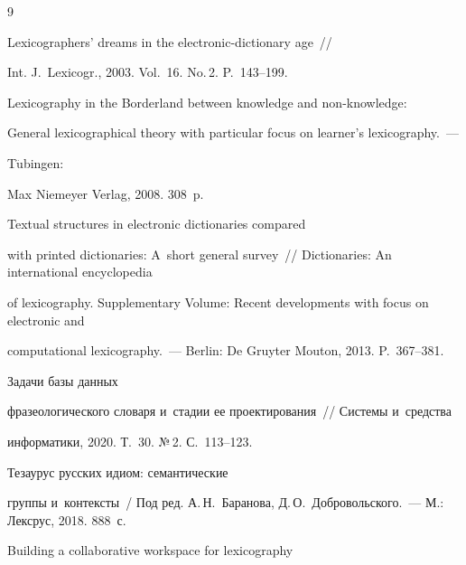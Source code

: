 {\small\frenchspacing

{%


\begin{thebibliography}{9}




 Lexicographers' dreams in the electronic-dictionary age~/\!\!/ 

Int. J.~Lexicogr., 2003. Vol.~16. No.\,2. P.~143--199.




 Lexicography in the Borderland between knowledge and non-knowledge: 

General lexicographical theory with particular focus on learner's lexicography.~---

T$\ddot{\mbox{u}}$bingen: 

Max Niemeyer Verlag, 2008. 308~p.




 Textual structures in electronic dictionaries compared 

with printed dictionaries: A~short general survey~/\!\!/ Dictionaries: An international encyclopedia 

of lexicography. Supplementary Volume: Recent developments with focus on electronic and 

computational lexicography.~--- Berlin: De Gruyter Mouton, 2013. P.~367--381.




 Задачи базы данных 

фразеологического словаря и~стадии ее проектирования~/\!\!/ Системы и~средства 

информатики, 2020. Т.~30. №\,2. С.~113--123.


 Тезаурус русских идиом: семантические 

группы и~контексты~/ Под ред.  А.\,Н.~Баранова, Д.\,О.~Добровольского.~--- М.: Лексрус, 2018. 888~с.


 Building a collaborative workspace for lexicography 


\end{thebibliography}}}
